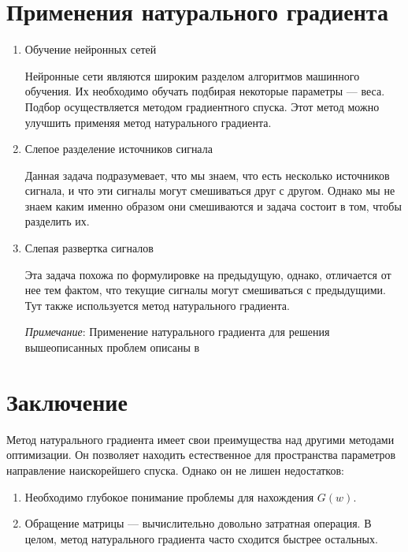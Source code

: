 \documentclass[a4paper,12pt]{article}
\begin{document}
\newpage

\section{Применения натурального градиента}
\begin{enumerate}
    \item Обучение нейронных сетей

        Нейронные сети являются широким разделом алгоритмов машинного обучения.
        Их необходимо обучать подбирая некоторые параметры --- веса. Подбор осуществляется методом градиентного спуска.
        Этот метод можно улучшить применяя метод натурального градиента.

    \item Слепое разделение источников сигнала

        Данная задача подразумевает, что мы знаем, что есть несколько источников сигнала, и что эти сигналы могут смешиваться
        друг с другом. Однако мы не знаем каким именно образом они смешиваются и задача состоит в том, чтобы разделить их.

    \item Слепая развертка сигналов

        Эта задача похожа по формулировке на предыдущую, однако, отличается от нее тем фактом, что текущие сигналы могут смешиваться
        с предыдущими. Тут также используется метод натурального градиента.

    \emph{Примечание}:
        Применение натурального градиента для решения вышеописанных проблем описаны в \cite{AmariWorks}
\end{enumerate}
\newpage
 
\section{Заключение}
Метод натурального градиента имеет свои преимущества над другими методами оптимизации. Он позволяет находить естественное для пространства параметров направление наискорейшего спуска. Однако он не лишен недостатков: 
\begin{enumerate}
    \item Необходимо глубокое понимание проблемы для нахождения $G(w)$. 
    \item Обращение матрицы --- вычислительно довольно затратная операция. В целом, метод натурального градиента часто сходится быстрее остальных.
\end{enumerate}
\newpage 
\end{document}
